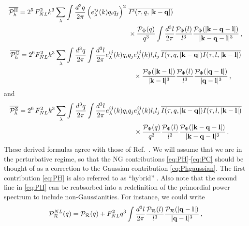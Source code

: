 \documentclass[a4paper,11pt]{article}
\numberwithin{equation}{section}
\begin{document}
\begin{align}\label{eq:PH}
\overline{{\cal P}^{\rm H}_h}=2^5 \,F_{NL}^2k^3\sum_\lambda\int \frac{d^3q}{2\pi}  \left(e_\lambda^{ij}(k)q_iq_j\right)^2\,\,&\overline{I^2(\tau,q,|\mathbf{k}-\mathbf{q}|)}\nonumber\\&\times\frac{{\cal P}_\Phi(q)}{q^3}
\int \frac{d^3l}{2\pi}\frac{{\cal P}_\Phi(l)}{l^3}\frac{{\cal P}_\Phi(|\mathbf{k}-\mathbf{q}-\mathbf{l}|)}{|\mathbf{k}-\mathbf{q}-\mathbf{l}|^3}\,,
\end{align}
\begin{align}\label{eq:PC}
\overline{{\cal P}^{\rm C}_h}=2^6F_{NL}^2k^3\sum_\lambda\int \frac{d^3q}{2\pi}\int \frac{d^3l}{2\pi} e_\lambda^{ij}(k)q_iq_j&e_\lambda^{ij}(k)l_il_j \,\overline{I(\tau,q,|\mathbf{k}-\mathbf{q}|)I(\tau,l,|\mathbf{k}-\mathbf{l}|)}\nonumber\\&
\times\frac{{\cal P}_\Phi(|\mathbf{k}-\mathbf{l}|)}{|\mathbf{k}-\mathbf{l}|^3}\frac{{\cal P}_\Phi(l)}{l^3}\frac{{\cal P}_\Phi(|\mathbf{q}-\mathbf{l}|)}{|\mathbf{q}-\mathbf{l}|^3}\,,
\end{align}
and
\begin{align}\label{eq:PZ}
\overline{{\cal P}^{\rm Z}_h}=2^6\,F_{NL}^2k^3\sum_\lambda\int \frac{d^3q}{2\pi}\int \frac{d^3l}{2\pi} e_\lambda^{ij}(k)q_iq_j&e_\lambda^{ij}(k)l_il_j  \,\overline{I(\tau,q,|\mathbf{k}-\mathbf{q}|)I(\tau,l,|\mathbf{k}-\mathbf{l}|)}\nonumber\\&
\times\frac{{\cal P}_\Phi(q)}{q^3}\frac{{\cal P}_\Phi(l)}{l^3}\frac{{\cal P}_\Phi(|\mathbf{k}-\mathbf{q}-\mathbf{l}|)}{|\mathbf{k}-\mathbf{q}-\mathbf{l}|^3}\,.
\end{align}
These derived formulas agree with those of Ref.~\cite{Adshead:2021hnm}. We will assume that we are in the perturbative regime, so that the NG contributions \eqref{eq:PH}-\eqref{eq:PC} should be thought of as a correction to the Gaussian contribution \eqref{eq:Phgaussian}. The first contribution \eqref{eq:PH} is also referred to as ``hybrid'' \cite{Unal:2018yaa}. Also note that the second line in \eqref{eq:PH} can be reabsorbed into a redefinition of the primordial power spectrum to include non-Gaussianities. For instance, we could write
\begin{align}\label{eq:redefNG}
{\cal P}_{\cal R}^{NL}(q)={\cal P}_{\cal R}(q)+F^2_{NL}q^3\int \frac{d^3l}{2\pi} \frac{{\cal P}_{\cal R}(l)}{l^3} \frac{{\cal P}_{\cal R}(|\mathbf{q}-\mathbf{l}|)}{|\mathbf{q}-\mathbf{l}|^3}\,,
\end{align}
\end{document}
